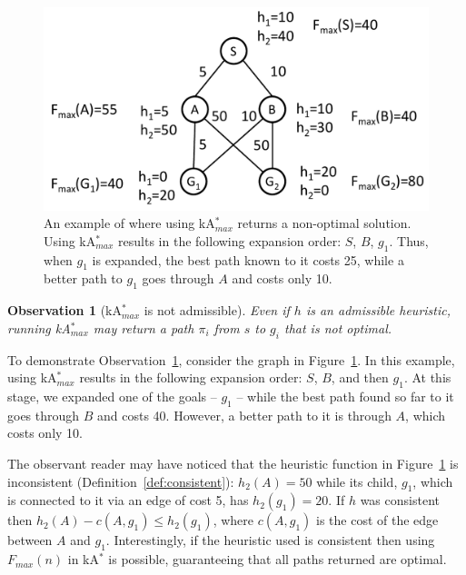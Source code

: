 \documentclass{aicom2e}
\newtheorem{observation}{Observation}
\newcommand{\kastar}{kA$^*$}
\newcommand{\kastarmax}{kA$^*_{max}$}
\newcommand{\maxf}{$F_{max}(n)$}
\begin{document}

\begin{figure}
 \includegraphics[width=\columnwidth]{max-bad_cropped.pdf}
 \caption{An example of where using \kastarmax{} returns a non-optimal solution. Using \kastarmax{} results in the following expansion order: $S$, $B$, $g_1$. 
 Thus, when $g_1$ is expanded, the best path known to it costs 25, while a
 better path to $g_1$ goes through $A$ and costs only 10.}
 \label{fig:max-bad}
 \end{figure}

 \begin{observation}[\kastarmax{} is not admissible]
    Even if $h$ is an admissible heuristic,
    running \kastarmax{} may return a path $\pi_i$ from $s$ to $g_i$ that is not optimal.
    \label{obs:max-f-inadmissible}
 \end{observation}


To demonstrate Observation~\ref{obs:max-f-inadmissible}, consider the graph in
Figure~\ref{fig:max-bad}. In this example, using \kastarmax{} results in the following
expansion order: $S$, $B$, and then $g_1$. At this stage, we expanded one of
the goals -- $g_1$ -- while the best path found so far to it goes through $B$
and costs 40. However, a better path to it is through $A$, which costs only 10.




The observant reader may have noticed that the heuristic function in
Figure~\ref{fig:max-bad} is inconsistent (Definition~\ref{def:consistent}):
$h_2(A)=50$ while its child, $g_1$, which is connected to it via an edge of
cost 5, has $h_2(g_1)=20$. If $h$ was consistent then $h_2(A)-c(A,g_1)\leq
h_2(g_1)$, where $c(A,g_1)$ is the cost of the edge between $A$ and $g_1$.
Interestingly, if the heuristic used is consistent then using \maxf{} in
\kastar{} is possible, guaranteeing that all paths returned are optimal.
\end{document}

